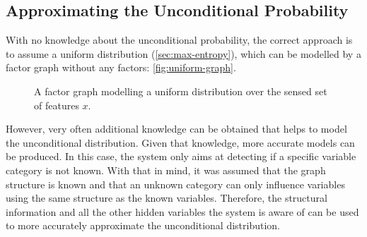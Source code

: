 \subsection{Approximating the Unconditional Probability}

With no knowledge about the unconditional probability, the correct approach is to
assume a uniform distribution (\autoref{sec:max-entropy}), which can be modelled by a
factor graph without any factors: \autoref{fig:uniform-graph}.

\begin{figure}[h]
\centering
{}
\caption{\label{fig:uniform-graph}A factor graph modelling a uniform
         distribution over the sensed set of features $x$.}
\end{figure}

However, very often additional knowledge can be obtained
that helps to model the unconditional distribution. Given that knowledge, more accurate
models can be produced. 
In this case, the system only aims at detecting if a specific variable category is not
known. With that in mind, it was assumed that the graph structure is known and that an unknown
category can only influence variables using the same structure as the known variables.
Therefore, the structural information and all the other hidden variables the system is aware of
can be used to more accurately approximate the unconditional distribution.

